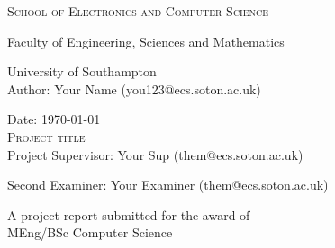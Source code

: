 
\begin{titlepage}
	
\begin{center}

\textsc{\large{School of Electronics and Computer Science}}

\large{Faculty of Engineering, Sciences and Mathematics}

\large{University of Southampton}\\[3.5cm]

\large{Author: Your Name (you123@ecs.soton.ac.uk)}

\large{Date: \today}\\[4.0cm]

\textsc{\LARGE Project title}\\[4.5cm] 

\large{Project Supervisor: Your Sup (them@ecs.soton.ac.uk)}

\large{Second Examiner: Your Examiner (them@ecs.soton.ac.uk)}

\vfill

\large{A project report submitted for the award of}\\[0.0cm]

\large{MEng/BSc Computer Science}

\end{center}

\end{titlepage}
